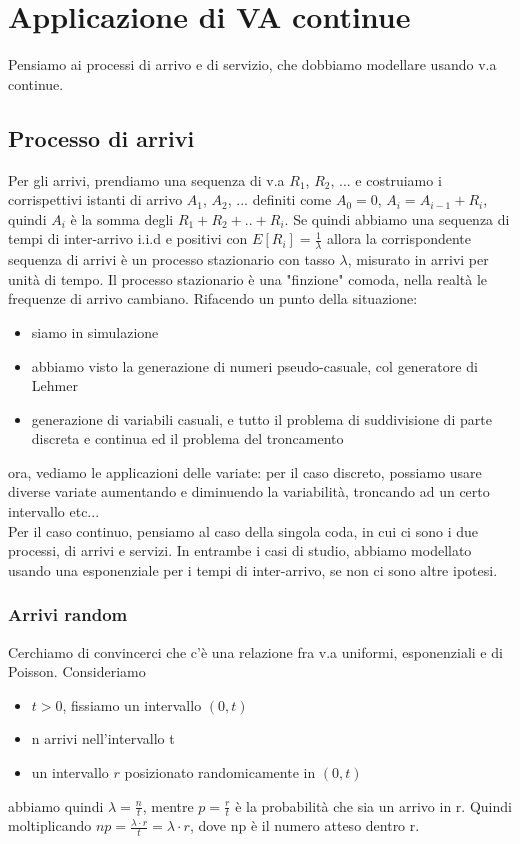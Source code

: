 \documentclass{article}
\begin{document}
\section{Applicazione di VA continue}
Pensiamo ai processi di arrivo e di servizio, che dobbiamo modellare usando v.a continue.
\subsection{Processo di arrivi}
Per gli arrivi, prendiamo una sequenza di v.a $R_1$, $R_2$, ... e costruiamo i corrispettivi istanti di arrivo $A_1$, $A_2$, ... definiti come $A_0 = 0$, $A_i = A_{i-1} + R_i$, quindi $A_i$ è la somma degli $R_1 + R_2 +..+ R_i$. Se quindi abbiamo una sequenza di tempi di inter-arrivo i.i.d e positivi con $E[R_i] = \frac{1}{\lambda}$ allora la corrispondente sequenza di arrivi è un processo stazionario con tasso $\lambda$, misurato in arrivi per unità di tempo. Il processo stazionario è una "finzione" comoda, nella realtà le frequenze di arrivo cambiano. Rifacendo un punto della situazione:
\begin{itemize}
\item siamo in simulazione
\item abbiamo visto la generazione di numeri pseudo-casuale, col generatore di Lehmer
\item generazione di variabili casuali, e tutto il problema di suddivisione di parte discreta e continua ed il problema del troncamento
\end{itemize}
ora, vediamo le applicazioni delle variate: per il caso discreto, possiamo usare diverse variate aumentando e diminuendo la variabilità, troncando ad un certo intervallo etc...\\ Per il caso continuo, pensiamo al caso della singola coda, in cui ci sono i due processi, di arrivi e servizi. In entrambe i casi di studio, abbiamo modellato usando una esponenziale per i tempi di inter-arrivo, se non ci sono altre ipotesi.
\subsubsection{Arrivi random}
Cerchiamo di convincerci che c'è una relazione fra v.a uniformi, esponenziali e di Poisson. Consideriamo
\begin{itemize}
\item $t > 0$, fissiamo un intervallo $(0, t)$
\item n arrivi nell'intervallo t
\item un intervallo $r$ posizionato randomicamente in $(0, t)$
\end{itemize}
abbiamo quindi $\lambda = \frac{n}{t}$, mentre $p = \frac{r}{t}$ è la probabilità che sia un arrivo in r. Quindi moltiplicando $np = \frac{\lambda \cdot r}{t} = \lambda \cdot r$, dove np è il numero atteso dentro r.
\end{document}
